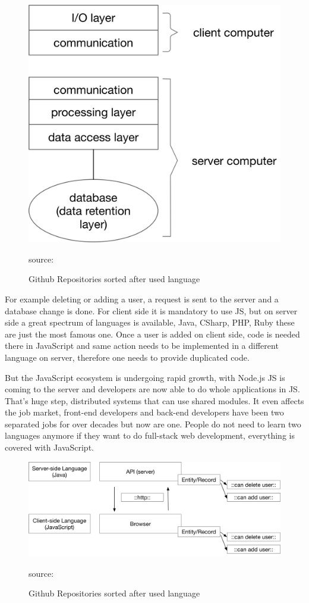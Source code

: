 \begin{figure}[hb]
	\centering
	\includegraphics[scale=0.5]{bilder/grundlagen/Three-Tier.png}
	\caption{Github Repositories sorted after used language} source:\cite{JS}
	\label{fig:JS}
\end{figure}
For example deleting or adding a user, a request is sent to the server and a database change is done. For client side it is mandatory to use \gls{JS}, but on server side  a great spectrum of languages is available, Java, CSharp, PHP, Ruby these are just the most famous one. Once a user is added on client side, code is needed there in JavaScript and same action needs to be implemented in a different language on server, therefore one needs to provide duplicated code.

But the JavaScript ecosystem is undergoing rapid growth, with Node.js \gls{JS} is coming to the server and developers are now able to do whole applications in \gls{JS}. That's huge step, distributed systems that can use shared modules. It even affects the job market, front-end developers and back-end developers have been two separated jobs for over decades but now are one. People do not need to learn two languages anymore if they want to do full-stack web development, everything is covered with JavaScript.

\begin{figure}[hb]
	\centering
	\includegraphics[scale=0.5]{bilder/grundlagen/Entity1.png}
	\caption{Github Repositories sorted after used language} source:\cite{JS}
	\label{fig:JS}
\end{figure}

